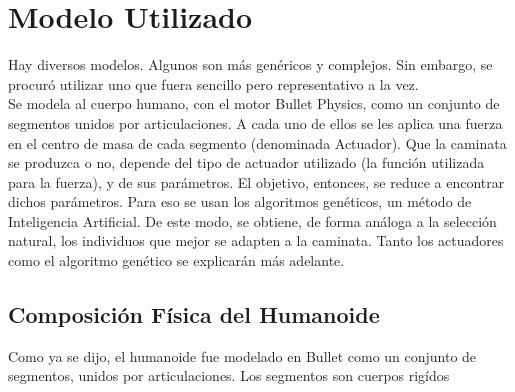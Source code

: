 \documentclass{article}
\begin{document}




\section{Modelo Utilizado}

Hay diversos modelos. Algunos son m\'as gen\'ericos \cite{flexibleMuscle} \cite{Wojtyra} y complejos.  Sin embargo, se procur\'o utilizar uno que fuera sencillo pero representativo a la vez.\\ 
Se modela al cuerpo humano, con el motor Bullet Physics, como un conjunto de segmentos unidos por articulaciones. A cada uno de ellos se les aplica una fuerza en el centro de masa de cada segmento (denominada Actuador). Que la caminata se produzca o no, depende del tipo de actuador utilizado (la funci\'on utilizada para la fuerza), y de sus par\'ametros. El objetivo, entonces, se reduce a encontrar dichos par\'ametros. Para eso se usan los algoritmos gen\'eticos, un m\'etodo de Inteligencia Artificial. De este modo, se obtiene, de forma an\'aloga a la selecci\'on natural, los individuos que mejor se adapten a la caminata. Tanto los actuadores como el algoritmo gen\'etico se explicar\'an m\'as adelante. \\ 

\subsection{Composici\'on F\'isica del Humanoide}
Como ya se dijo, el humanoide fue modelado en Bullet como un conjunto de segmentos, unidos por articulaciones. Los segmentos son cuerpos rig\'idos 
\end{document}
